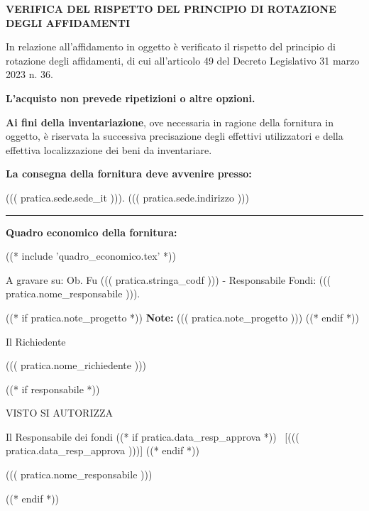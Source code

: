 \textbf{VERIFICA DEL RISPETTO DEL PRINCIPIO DI ROTAZIONE DEGLI AFFIDAMENTI}

In relazione all’affidamento in oggetto è verificato il rispetto del
principio di rotazione degli affidamenti, di cui all’articolo 49 del
Decreto Legislativo 31 marzo 2023 n. 36. 

\textbf{L’acquisto non prevede ripetizioni o altre opzioni.}

\textbf{Ai fini della inventariazione}, ove necessaria in ragione della fornitura
in oggetto, è riservata la successiva precisazione degli effettivi
utilizzatori e della effettiva localizzazione dei beni da inventariare.

\textbf{La consegna della fornitura deve avvenire presso:}

((( pratica.sede.sede_it ))). ((( pratica.sede.indirizzo )))
\par\noindent\rule{\textwidth}{0.4pt}

\textbf{Quadro economico della fornitura: }

((* include 'quadro_economico.tex' *))

\begin{minipage}{\linewidth}
A gravare su: Ob. Fu ((( pratica.stringa_codf ))) - 
Responsabile Fondi: ((( pratica.nome_responsabile ))).

((* if pratica.note_progetto *))
\vspace{0.5cm}
\textbf{Note:}
	((( pratica.note_progetto )))
((* endif *))

\vspace{0.5cm}
\begin{flushright}
\begin{minipage}[c]{6cm}
\begin{center}
Il Richiedente

((( pratica.nome_richiedente )))

\end{center}
\end{minipage}
\end{flushright}
\end{minipage}

((* if responsabile *))
\begin{minipage}{\linewidth}
\begin{center}
	VISTO SI AUTORIZZA
\end{center}
\vspace{8mm}

\begin{flushright}
\begin{minipage}[c]{6cm}
\begin{center}
Il Responsabile dei fondi
((* if pratica.data_resp_approva *)) ~[((( pratica.data_resp_approva )))] ((* endif *))

((( pratica.nome_responsabile )))

\end{center}
\end{minipage}
\end{flushright}
\end{minipage}
((* endif *))

